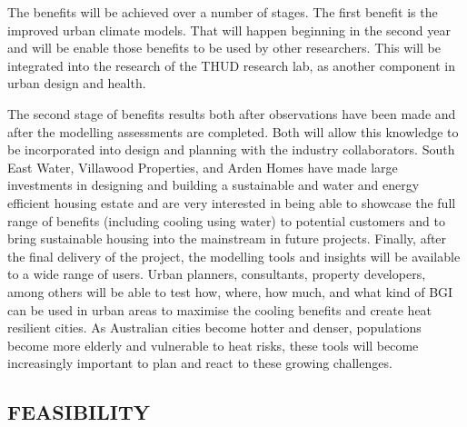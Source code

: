 
The benefits will be achieved over a number of stages. The first benefit is the improved urban climate models. That will happen beginning in the second year and will be enable those benefits to be used by other researchers. This will be integrated into the research of the THUD research lab, as another component in urban design and health. 

The second stage of benefits results both after observations have been made and after the modelling assessments are completed. Both will allow this knowledge to be incorporated into design and planning with the industry collaborators. South East Water, Villawood Properties, and Arden Homes have made large investments in designing and building a sustainable and water and energy efficient housing estate and are very interested in being able to showcase the full range of benefits (including cooling using water) to potential customers and to bring sustainable housing into the mainstream in future projects. Finally, after the final delivery of the project, the modelling tools and insights will be available to a wide range of users. Urban planners, consultants, property developers, among others will be able to test how, where, how much, and what kind of BGI can be used in urban areas to maximise the cooling benefits and create heat resilient cities. As Australian cities become hotter and denser, populations become more elderly and vulnerable to heat risks, these tools will become increasingly important to plan and react to these growing challenges.

\subsection*{\TitleFont FEASIBILITY}



